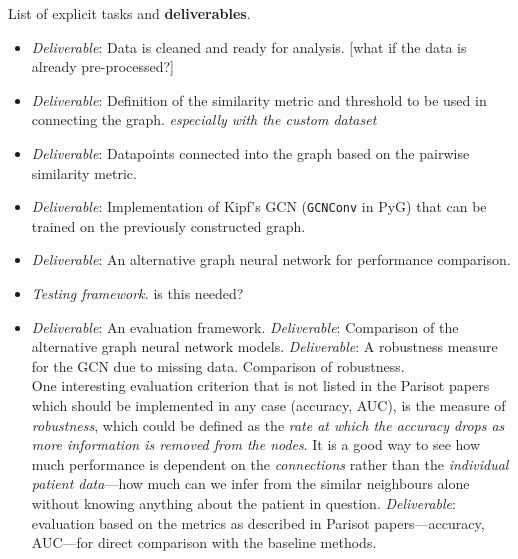 \documentclass[12pt,a4paper,twoside]{article}
\begin{document}
List of explicit tasks and \textbf{deliverables}.
\begin{itemize}
  \item \textit{Deliverable}: Data is cleaned and ready for analysis. [what if the data is already pre-processed?] %
  \item \textit{Deliverable}: Definition of the similarity metric and threshold to be used in connecting the graph. \textit{especially with the custom dataset}
  \item \textit{Deliverable}: Datapoints connected into the graph based on the pairwise similarity metric.
  \item \textit{Deliverable}: Implementation of Kipf's GCN \cite{kipf2017semi} (\texttt{GCNConv} in PyG) that can be trained on the previously constructed graph.
  \item \textit{Deliverable}: An alternative graph neural network for performance comparison.
  \item \textit{Testing framework.} is this needed?
  \item \textit{Deliverable}: An evaluation framework. \textit{Deliverable}: Comparison of the alternative graph neural network models. \textit{Deliverable}: A robustness measure for the GCN due to missing data. Comparison of robustness. \medskip \\  One interesting evaluation criterion that is not listed in the Parisot papers which should be implemented in any case (accuracy, AUC), is the measure of \textit{robustness}, which could be defined as the \textit{rate at which the accuracy drops as more information is removed from the nodes}. It is a good way to see how much performance is dependent on the \textit{connections} rather than the \textit{individual patient data}—how much can we infer from the similar neighbours alone without knowing anything about the patient in question. \textit{Deliverable}: evaluation based on the metrics as described in Parisot papers—accuracy, AUC—for direct comparison with the baseline methods.
\end{itemize}
\end{document}
